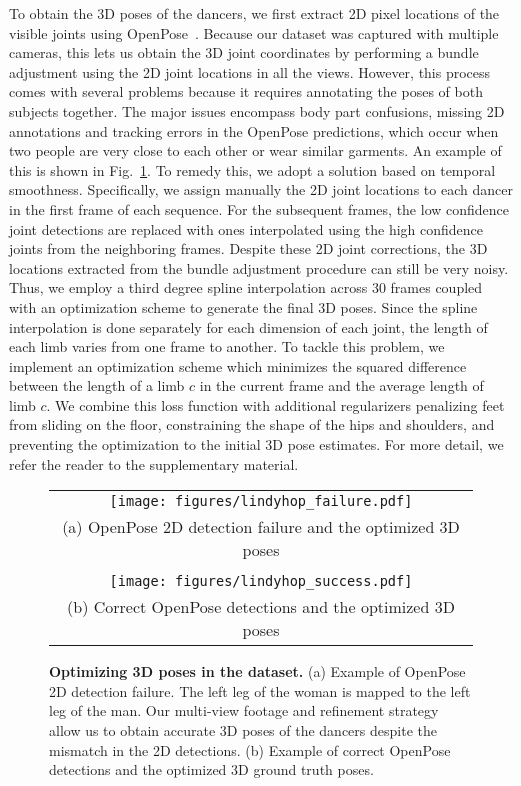 To obtain the 3D poses of the dancers, we first extract 2D pixel locations of the visible joints using OpenPose~\cite{Cao17}. Because our dataset was captured with multiple cameras, this lets us obtain the  3D joint coordinates by performing a bundle adjustment using the 2D joint locations in all the views. However, this process comes with several problems because it requires annotating the poses of both subjects together. The major issues encompass body part confusions, missing 2D annotations and tracking errors in the OpenPose predictions, which occur when two people are very close to each other or wear similar garments. An example of this is shown in Fig.~\ref{fig:optimizing_3dposes}. To remedy this, we adopt a solution based on temporal smoothness. Specifically, we assign manually the 2D joint locations to each dancer in the first frame of each sequence. For the subsequent frames, the low confidence joint detections are replaced with ones interpolated using the high confidence joints from the neighboring frames. Despite these 2D joint corrections, the 3D locations extracted from the bundle adjustment procedure can still be very noisy. Thus, we employ a third degree spline interpolation across 30 frames coupled with an optimization scheme to generate the final 3D poses. Since the spline interpolation is done separately for each dimension of each joint, the length of each limb varies from one frame to another. To tackle this problem, we implement an optimization scheme which minimizes the squared difference between the length of a limb $c$ in the current frame and the average length of  limb $c$. We combine this loss function with additional regularizers penalizing feet from sliding on the floor, constraining the shape of the hips and shoulders, and preventing the optimization to the initial 3D pose estimates. For more detail, we refer the reader to the supplementary material.


\begin{figure}
	\centering
	\begin{tabular}{c}
		
		\texttt{[image: figures/lindyhop\_failure.pdf]} \\
		(a) \footnotesize OpenPose 2D detection failure and the optimized 3D poses \\ \\
		\texttt{[image: figures/lindyhop\_success.pdf]} \\
		(b) \footnotesize Correct OpenPose detections and the optimized 3D poses\\
	\end{tabular}
	\caption[Optimizing 3D poses in the \lindyhop{} dataset]{\textbf{Optimizing 3D poses in the \lindyhop{} dataset.} (a) Example of OpenPose 2D detection failure. The left leg of the woman is mapped to the left leg of the man. Our multi-view footage and refinement strategy allow us to obtain accurate 3D poses of the dancers despite the mismatch in the 2D detections. (b) Example of correct OpenPose detections and the optimized 3D ground truth poses.}
	\label{fig:optimizing_3dposes}
	\vspace{-4mm}
\end{figure}


